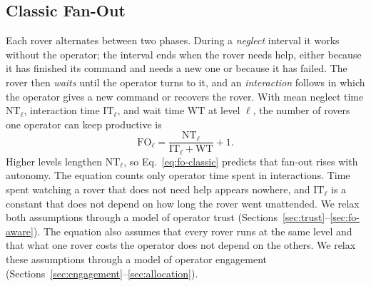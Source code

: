 \documentclass[conference]{IEEEtran}
\begin{document}
\subsection{Classic Fan-Out}
\label{sec:classic-fo}
Each rover alternates between two phases. During a \emph{neglect}
interval it works without the operator; the interval ends when the
rover needs help, either because it has finished its command and needs
a new one or because it has failed. The rover then \emph{waits} until
the operator turns to it, and an \emph{interaction} follows in which
the operator gives a new command or recovers the rover. With mean
neglect time $\mathrm{NT}_\ell$, interaction time $\mathrm{IT}_\ell$,
and wait time $\mathrm{WT}$ at level $\ell$, the number of rovers one
operator can keep productive
is~\cite{olsen2004fanout,cummings2008predicting}
\begin{equation}
  \mathrm{FO}_\ell = \frac{\mathrm{NT}_\ell}{\mathrm{IT}_\ell + \mathrm{WT}} + 1 .
  \label{eq:fo-classic}
\end{equation}
Higher levels lengthen $\mathrm{NT}_\ell$, so Eq.~\eqref{eq:fo-classic}
predicts that fan-out rises with autonomy. The equation counts only
operator time spent in interactions. Time spent watching a rover that
does not need help appears nowhere, and $\mathrm{IT}_\ell$ is a
constant that does not depend on how long the rover went unattended.
We relax both assumptions through a model of operator trust
(Sections~\ref{sec:trust}--\ref{sec:fo-aware}). The equation also
assumes that every rover runs at the same level and that what one
rover costs the operator does not depend on the others. We relax
these assumptions through a model of operator engagement
(Sections~\ref{sec:engagement}--\ref{sec:allocation}).
\end{document}
